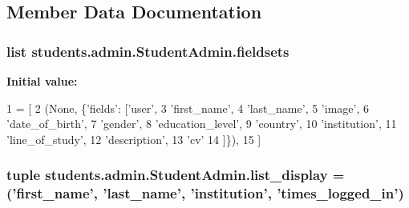 \subsection{Member Data Documentation}
\hypertarget{classstudents_1_1admin_1_1_student_admin_afbc84f07097db4554415109336880a72}{
\subsubsection[{fieldsets}]{\setlength{\rightskip}{0pt plus 5cm}list students.\-admin.\-Student\-Admin.\-fieldsets\hspace{0.3cm}{\ttfamily [static]}}}\label{classstudents_1_1admin_1_1_student_admin_afbc84f07097db4554415109336880a72}
{\bfseries Initial value\-:}
\begin{DoxyCode}
1 = [
2         (\textcolor{keywordtype}{None}, \{\textcolor{stringliteral}{'fields'}: [\textcolor{stringliteral}{'user'},
3                            \textcolor{stringliteral}{'first\_name'},
4                            \textcolor{stringliteral}{'last\_name'},
5                            \textcolor{stringliteral}{'image'},
6                            \textcolor{stringliteral}{'date\_of\_birth'},
7                            \textcolor{stringliteral}{'gender'},
8                            \textcolor{stringliteral}{'education\_level'},
9                            \textcolor{stringliteral}{'country'},
10                            \textcolor{stringliteral}{'institution'},
11                            \textcolor{stringliteral}{'line\_of\_study'},
12                            \textcolor{stringliteral}{'description'},
13                            \textcolor{stringliteral}{'cv'}
14                            ]\}),
15     ]
\end{DoxyCode}
\hypertarget{classstudents_1_1admin_1_1_student_admin_a9d2c7c62d35bba277480bb9333c68ff1}{
\subsubsection[{list\-\_\-display}]{\setlength{\rightskip}{0pt plus 5cm}tuple students.\-admin.\-Student\-Admin.\-list\-\_\-display = ('first\-\_\-name', 'last\-\_\-name', 'institution', 'times\-\_\-logged\-\_\-in')\hspace{0.3cm}{\ttfamily [static]}}}\label{classstudents_1_1admin_1_1_student_admin_a9d2c7c62d35bba277480bb9333c68ff1}
